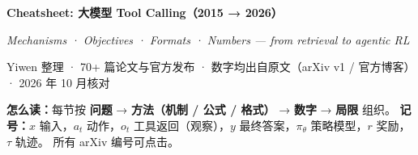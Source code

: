 \documentclass[8pt]{extarticle}
\begin{document}
\begin{tcolorbox}[enhanced,colback=cblue!5,colframe=cblue!40,boxrule=0.6pt,arc=2pt,left=7pt,right=7pt,top=4pt,bottom=4pt]
\begin{minipage}[t]{0.56\linewidth}
{\fontsize{17}{21}\selectfont\bfseries Cheatsheet: 大模型 Tool Calling（2015 → 2026）}\par\vspace{2pt}
{\itshape\color{cgray} Mechanisms · Objectives · Formats · Numbers — from retrieval to agentic RL}\par
{\small\color{cgray} Yiwen 整理 · 70+ 篇论文与官方发布 · 数字均出自原文（arXiv v1 / 官方博客）· 2026 年 10 月核对}
\end{minipage}\hfill
\begin{minipage}[t]{0.42\linewidth}\small
\textbf{怎么读：}每节按 \textbf{\color{cred}问题} → \textbf{\color{cblue}方法（机制 / 公式 / 格式）} → \textbf{数字} → \textbf{\color{corange}局限} 组织。
\textbf{记号：}$x$ 输入，$a_t$ 动作，$o_t$ 工具返回（观察），$y$ 最终答案，$\pi_\theta$ 策略模型，$r$ 奖励，$\tau$ 轨迹。
所有 arXiv 编号可点击。
\end{minipage}
\end{tcolorbox}
\end{document}
